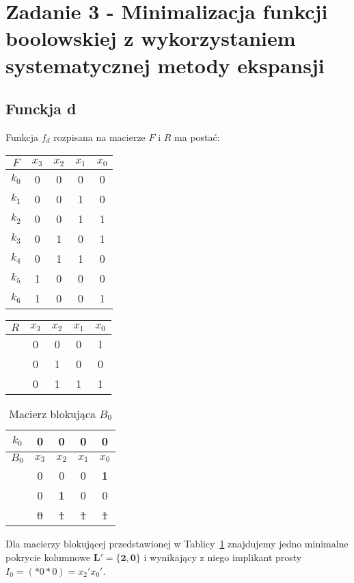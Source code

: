 \documentclass[a4paper, 12pt]{article}
\begin{document}
    \newpage
    \section{Zadanie 3 - Minimalizacja funkcji boolowskiej z wykorzystaniem systematycznej metody ekspansji}
    \label{sec:task-3}
    \subsection{Funckja d}\label{subsec:fun-d}
    Funkcja $f_d$ rozpisana na macierze $F$ i $R$ ma postać:
    \begin{center}
        \begin{tabular}[t]{ |c|c c c c| }
            \hline
            $F$ & $x_3$ & $x_2$ & $x_1$ & $x_0$ \\
            \hline
            $k_0$ & 0 & 0 & 0 & 0 \\
            $k_1$ & 0 & 0 & 1 & 0 \\
            $k_2$ & 0 & 0 & 1 & 1 \\
            $k_3$ & 0 & 1 & 0 & 1 \\
            $k_4$ & 0 & 1 & 1 & 0 \\
            $k_5$ & 1 & 0 & 0 & 0 \\
            $k_6$ & 1 & 0 & 0 & 1 \\
            \hline
        \end{tabular}
        \hspace{1cm}
        \begin{tabular}[t]{ |c|c c c c| }
            \hline
            $R$ & $x_3$ & $x_2$ & $x_1$ & $x_0$ \\
            \hline
            & 0 & 0 & 0 & 1 \\
            & 0 & 1 & 0 & 0 \\
            & 0 & 1 & 1 & 1 \\
            \hline
        \end{tabular}
    \end{center}

    \begin{table}[H]
        \centering
        \begin{tabular}[t]{ |c|c c c c| }
            \hline
            $k_0$ & 0 & 0 & 0 & 0 \\
            \hline\hline
            $B_0$ & $x_3$ & $x_2$ & $x_1$ & $x_0$ \\
            \hline
            & 0 & 0 & 0 & \textbf{1} \\
            & 0 & \textbf{1} & 0 & 0 \\
            & \sout{0} & \sout{1} & \sout{1} & \sout{1} \\
            \hline
        \end{tabular}
        \caption{Macierz blokująca $B_0$} \label{tab:b0}
    \end{table}
    Dla macierzy blokującej przedstawionej w Tablicy~\ref{tab:b0} znajdujemy jedno minimalne pokrycie kolumnowe
    $\bm{L'=\{2,0\}}$ i wynikający z niego implikant prosty $I_0=(*0*0)=x_2'x_0'$.
\end{document}
